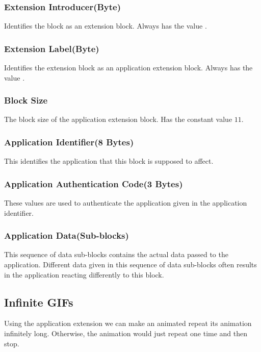 \subsubsection{Extension Introducer(Byte)}

Identifies the block as an extension block. Always has the value
.

\subsubsection{Extension Label(Byte)}

Identifies the extension block as an application extension
block. Always has the value .

\subsubsection{Block Size}

The block size of the application extension block. Has the constant
value $11$.

\subsubsection{Application Identifier(8 Bytes)}

This identifies the application that this block is supposed to
affect.

\subsubsection{Application Authentication Code(3 Bytes)}

These values are used to authenticate the application given in the
application identifier.

\subsubsection{Application Data(Sub-blocks)}

This sequence of data sub-blocks contains the actual data passed to
the application. Different data given in this sequence of data
sub-blocks often results in the application reacting differently to
this block.

\subsection{Infinite GIFs}

Using the application extension we can make an animated \gif repeat
its animation infinitely long. Otherwise, the animation would just
repeat one time and then stop.

